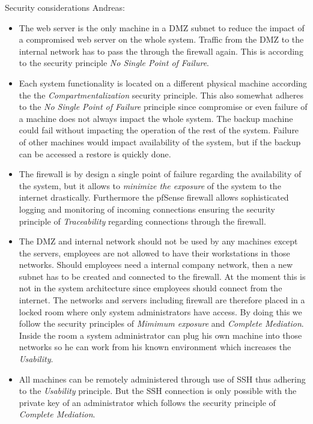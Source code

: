 \documentclass[english]{article}
\begin{document}
Security considerations Andreas:
\begin{itemize}
    \item The web server is the only machine in a DMZ subnet to reduce the impact of a compromised web server on the whole system. Traffic from the DMZ to the internal network has to pass the through the firewall again. This is according to the security principle \emph{No Single Point of Failure}.
    \item Each system functionality is located on a different physical machine according the the \emph{Compartmentalization} security principle. This also somewhat adheres to the \emph{No Single Point of Failure} principle since compromise or even failure of a machine does not always impact the whole system. The backup machine could fail without impacting the operation of the rest of the system. Failure of other machines would impact availability of the system, but if the backup can be accessed a restore is quickly done.
    \item The firewall is by design a single point of failure regarding the availability of the system, but it allows to \emph{minimize the exposure} of the system to the internet drastically. Furthermore the pfSense firewall allows sophisticated logging and monitoring of incoming connections ensuring the security principle of \emph{Traceability} regarding connections through the firewall.
    \item The DMZ and internal network should not be used by any machines except the servers, employees are not allowed to have their workstations in those networks. Should employees need a internal company network, then a new subnet has to be created and connected to the firewall. At the moment this is not in the system architecture since employees should connect from the internet. The networks and servers including firewall are therefore placed in a locked room where only system administrators have access. By doing this we follow the security principles of \emph{Mimimum exposure} and \emph{Complete Mediation}. Inside the room a system administrator can plug his own machine into those networks so he can work from his known environment which increases the \emph{Usability}.
    \item All machines can be remotely administered through use of SSH thus adhering to the \emph{Usability} principle. But the SSH connection is only possible with the private key of an administrator which follows the security principle of \emph{Complete Mediation}.
\end{itemize}
\end{document}
